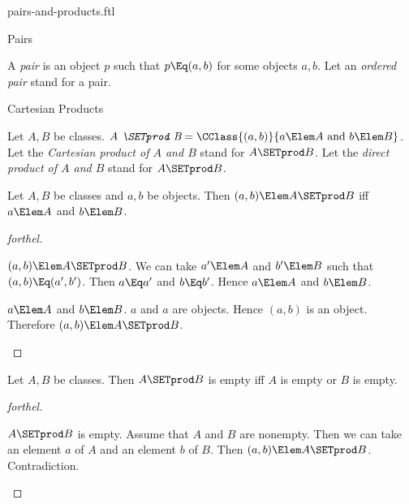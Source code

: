 \documentclass{stex}
\begin{document}
\begin{smodule}{pairs-and-products.ftl}

\begin{sfragment}{Pairs}
  \begin{definition}[forthel]
    A \emph{pair} is an object $p$ such that $p \Eq (a, b)$ for some objects $a, b$.
    Let an \emph{ordered pair} stand for a pair.
  \end{definition}
\end{sfragment}

\begin{sfragment}{Cartesian Products}
  \begin{definition}[forthel]
    Let $A, B$ be classes.
    $\emph{A \SETprod B} = \CClass{(a, b)}{a \Elem A\text{ and }b \Elem B}$.
    Let the \emph{Cartesian product of $A$ and $B$} stand for $A \SETprod B$.
    Let the \emph{direct product of $A$ and $B$} stand for $A \SETprod B$.
  \end{definition}

  \begin{proposition}[forthel]
    Let $A, B$ be classes and $a, b$ be objects.
    Then $(a, b) \Elem A \SETprod B$ iff $a \Elem A$ and $b \Elem B$.
  \end{proposition}
  \begin{proof}[forthel]
    \begin{case}{$(a, b) \Elem A \SETprod B$.}
      We can take $a' \Elem A$ and $b' \Elem B$ such that $(a, b) \Eq (a', b')$.
      Then $a \Eq a'$ and $b \Eq b'$.
      Hence $a \Elem A$ and $b \Elem B$.
    \end{case}

    \begin{case}{$a \Elem A$ and $b \Elem B$.}
      $a$ and $a$ are objects.
      Hence $(a, b)$ is an object.
      Therefore $(a, b) \Elem A \SETprod B$.
    \end{case}
  \end{proof}

  \begin{proposition}[forthel]
    Let $A, B$ be classes.
    Then $A \SETprod B$ is empty iff $A$ is empty or $B$ is empty.
  \end{proposition}
  \begin{proof}[forthel]
    \begin{case}{$A \SETprod B$ is empty.}
      Assume that $A$ and $B$ are nonempty.
      Then we can take an element $a$ of $A$ and an element $b$ of $B$.
      Then $(a, b) \Elem A \SETprod B$.
      Contradiction.
    \end{case}


\end{proof}
\end{sfragment}
\end{smodule}
\end{document}
